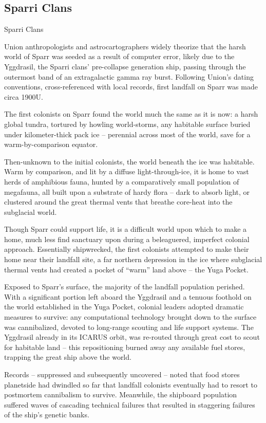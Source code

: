\subsection{Sparri Clans}

Sparri Clans

Union anthropologists and astrocartographers widely theorize that the harsh world of Sparr was
seeded as a result of computer error, likely due to the Yggdrasil, the Sparri clans’ pre-collapse
generation ship, passing through the outermost band of an extragalactic gamma ray burst.
Following Union’s dating conventions, cross-referenced with local records, first landfall on Sparr
was made circa 1900U.

The first colonists on Sparr found the world much the same as it is now: a harsh global tundra,
tortured by howling world-storms, any habitable surface buried under kilometer-thick pack ice --
perennial across most of the world, save for a warm-by-comparison equator.

Then-unknown to the initial colonists, the world beneath the ice was habitable. Warm by
comparison, and lit by a diffuse light-through-ice, it is home to vast herds of amphibious fauna,
hunted by a comparatively small population of megafauna, all built upon a substrate of hardy flora
-- dark to absorb light, or clustered around the great thermal vents that breathe core-heat into the
subglacial world.

Though Sparr could support life, it is a difficult world upon which to make a home, much less find
sanctuary upon during a beleaguered, imperfect colonial approach. Essentially shipwrecked, the
first colonists attempted to make their home near their landfall site, a far northern depression in
the ice where subglacial thermal vents had created a pocket of “warm” land above -- the Yuga
Pocket.

Exposed to Sparr’s surface, the majority of the landfall population perished. With a significant
portion left aboard the Yggdrasil and a tenuous foothold on the world established in the Yuga
Pocket, colonial leaders adopted dramatic measures to survive: any computational technology
brought down to the surface was cannibalized, devoted to long-range scouting and life support
systems. The Yggdrasil already in its ICARUS orbit, was re-routed through great cost to scout for
habitable land -- this repositioning burned away any available fuel stores, trapping the great ship
above the world.

Records -- suppressed and subsequently uncovered -- noted that food stores planetside had
dwindled so far that landfall colonists eventually had to resort to postmortem cannibalism to
survive. Meanwhile, the shipboard population suffered waves of cascading technical failures that
resulted in staggering failures of the ship’s genetic banks.

